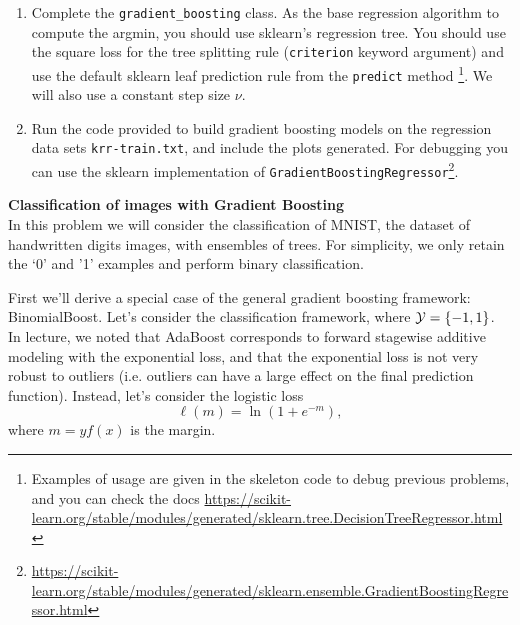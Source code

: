 \documentclass{article}
\newcommand{\nyuparagraph}[1]{\vspace{0.3cm}\textcolor{nyupurple}{\bf \large #1}\\}
\theoremstyle{plain}
\theoremstyle{definition}
\begin{document}
\begin{enumerate}
\setcounter{enumi}{\value{saveenum}}
  
\item Complete the \texttt{gradient\_boosting} class. As the base regression
algorithm to compute the argmin, you should use sklearn's regression tree. You should use
the square loss for the tree splitting rule (\texttt{criterion} keyword argument) and use the default sklearn leaf prediction rule from the \texttt{predict} method \footnote{Examples of usage are given in the skeleton code to debug previous problems, and you can check the docs \url{https://scikit-learn.org/stable/modules/generated/sklearn.tree.DecisionTreeRegressor.html}}. We will also use a constant step size $\nu$.\\


\item Run the code provided to build gradient
boosting models on the regression data sets \texttt{krr-train.txt}, and
include the plots generated. For debugging you can use the sklearn implementation of \texttt{GradientBoostingRegressor}\footnote{\url{https://scikit-learn.org/stable/modules/generated/sklearn.ensemble.GradientBoostingRegressor.html}}.
\setcounter{saveenum}{\value{enumi}}\\


\end{enumerate}

\nyuparagraph{Classification of images with Gradient Boosting}
In this problem we will consider the classification of MNIST, the dataset of handwritten digits images, with ensembles of trees. For simplicity, we only retain the `0' and '1' examples and perform binary classification.

First we'll derive a special case of the general gradient
boosting framework: BinomialBoost. 
Let's consider the classification framework, where $\mathcal{Y}=\left\{ -1,1\right\} $.
In lecture, we noted that AdaBoost corresponds to forward stagewise
additive modeling with the exponential loss, and that the exponential
loss is not very robust to outliers (i.e. outliers can have a large
effect on the final prediction function). Instead, let's consider
the logistic loss 
\[
\ell(m)=\ln\left(1+e^{-m}\right),
\]
where $m=yf(x)$ is the margin.
\end{document}
